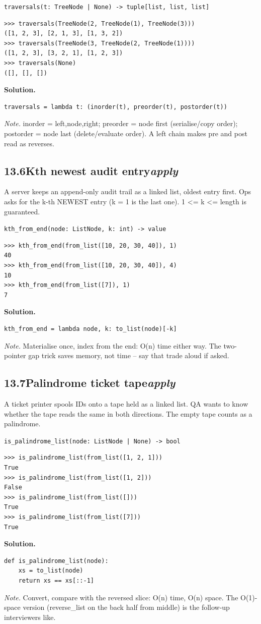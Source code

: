 \documentclass[10pt,letterpaper]{book}
\begin{document}
\noindent\texttt{traversals(t: TreeNode | None) -> tuple[list, list, list]}
\begin{lstlisting}[style=ex]
>>> traversals(TreeNode(2, TreeNode(1), TreeNode(3)))
([1, 2, 3], [2, 1, 3], [1, 3, 2])
>>> traversals(TreeNode(3, TreeNode(2, TreeNode(1))))
([1, 2, 3], [3, 2, 1], [1, 2, 3])
>>> traversals(None)
([], [], [])
\end{lstlisting}
\noindent\textbf{Solution.}
\begin{lstlisting}[style=code]
traversals = lambda t: (inorder(t), preorder(t), postorder(t))
\end{lstlisting}
\noindent\textit{Note.} inorder = left,node,right; preorder = node first (serialise/copy order); postorder = node last (delete/evaluate order). A left chain makes pre and post read as reverses.

\subsection*{13.6\quad Kth newest audit entry\hfill\textnormal{\textit{apply}}}
A server keeps an append-only audit trail as a linked list, oldest entry first. Ops asks for the k-th NEWEST entry (k = 1 is the last one). 1 <= k <= length is guaranteed.

\noindent\texttt{kth\_from\_end(node: ListNode, k: int) -> value}
\begin{lstlisting}[style=ex]
>>> kth_from_end(from_list([10, 20, 30, 40]), 1)
40
>>> kth_from_end(from_list([10, 20, 30, 40]), 4)
10
>>> kth_from_end(from_list([7]), 1)
7
\end{lstlisting}
\noindent\textbf{Solution.}
\begin{lstlisting}[style=code]
kth_from_end = lambda node, k: to_list(node)[-k]
\end{lstlisting}
\noindent\textit{Note.} Materialise once, index from the end: O(n) time either way. The two-pointer gap trick saves memory, not time -- say that trade aloud if asked.

\subsection*{13.7\quad Palindrome ticket tape\hfill\textnormal{\textit{apply}}}
A ticket printer spools IDs onto a tape held as a linked list. QA wants to know whether the tape reads the same in both directions. The empty tape counts as a palindrome.

\noindent\texttt{is\_palindrome\_list(node: ListNode | None) -> bool}
\begin{lstlisting}[style=ex]
>>> is_palindrome_list(from_list([1, 2, 1]))
True
>>> is_palindrome_list(from_list([1, 2]))
False
>>> is_palindrome_list(from_list([]))
True
>>> is_palindrome_list(from_list([7]))
True
\end{lstlisting}
\noindent\textbf{Solution.}
\begin{lstlisting}[style=code]
def is_palindrome_list(node):
    xs = to_list(node)
    return xs == xs[::-1]
\end{lstlisting}
\noindent\textit{Note.} Convert, compare with the reversed slice: O(n) time, O(n) space. The O(1)-space version (reverse\_list on the back half from middle) is the follow-up interviewers like.
\end{document}
